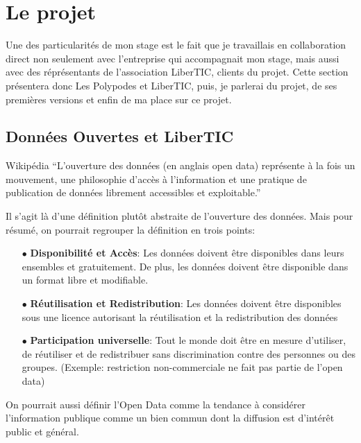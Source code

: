 \section{Le projet}

Une des particularités de mon stage est le fait que je travaillais en collaboration direct non seulement avec l'entreprise qui accompagnait mon stage, mais aussi avec des réprésentants de l'association LiberTIC, clients du projet. Cette section présentera donc Les Polypodes et LiberTIC, puis, je parlerai du projet, de ses premières versions et enfin de ma place sur ce projet.

\subsection{Données Ouvertes et LiberTIC}

\begin{aquote}{Wikipédia}
``L'ouverture des données (en anglais open data) représente à la fois un mouvement, une philosophie d'accès à l'information et une pratique de publication de données librement accessibles et exploitable.''
\end{aquote}

Il s'agit là d'une définition plutôt abstraite de l'ouverture des données. Mais pour résumé, on pourrait regrouper la définition en trois points:

\begin{itemize}
    \item[$\bullet$] \textbf{Disponibilité et Accès}: Les données doivent être disponibles dans leurs ensembles et gratuitement. De plus, les données doivent être disponible dans un format libre et modifiable.
    \item[$\bullet$] \textbf{Réutilisation et Redistribution}: Les données doivent être disponibles sous une licence autorisant la réutilisation et la redistribution des données
    \item[$\bullet$] \textbf{Participation universelle}: Tout le monde doit être en mesure d'utiliser, de réutiliser et de redistribuer sans discrimination contre des personnes ou des groupes. (Exemple: restriction non-commerciale ne fait pas partie de l'open data)
\end{itemize}

On pourrait aussi définir l'Open Data comme la tendance à considérer l'information publique comme un bien commun dont la diffusion est d'intérêt public et général.

\vspace{1cm}

